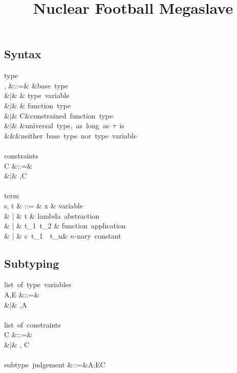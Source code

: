 \documentclass{amsart}
\title{Nuclear Football Megaslave}
\theoremstyle{definition}
\begin{document}
\maketitle
\tableofcontents

\subsection{Syntax}
\label{syntax}
\begin{syntax}
\mbox{type}\\
\sigma, \tau
&::=& \iota &\mbox{base type}\\
&|& \alpha & \mbox{type variable} \\
&|& \tau \rightarrow \tau & \mbox{function type} \\
&|& \tau\R\tau\Given C&\mbox{constrained function type}\\
&|& \All\alpha\tau&\mbox{universal type, as long as $\tau$ is}\\
&&&\quad\mbox{neither base type nor type variable}
\\
\\
\mbox{constraints}\\
C
&::=&\emptyset\\
&|& \tau\Sub\tau,C
\\
\\
\mbox{term}\\
s, t & ::= & x & \mbox{variable} \\
& | & t  & \mbox{lambda abstraction} \\
& | & t_1~t_2 & \mbox{function application} \\
& | & c~t_1~\cdots~t_n& \mbox{$n$-nary constant}
\end{syntax}

\subsection{Subtyping}

\begin{syntax}
\mbox{list of type variables}\\
A,E
&::=& \emptyset \\
&|& \alpha,A
\\
\\
\mbox{list of constraints}\\
C
&::=& \emptyset \\
&|& \sigma \Sub \tau, C
\\
\\
\mbox{subtype judgement}
&::=&A;E\vdash C
\end{syntax}
\end{document}
